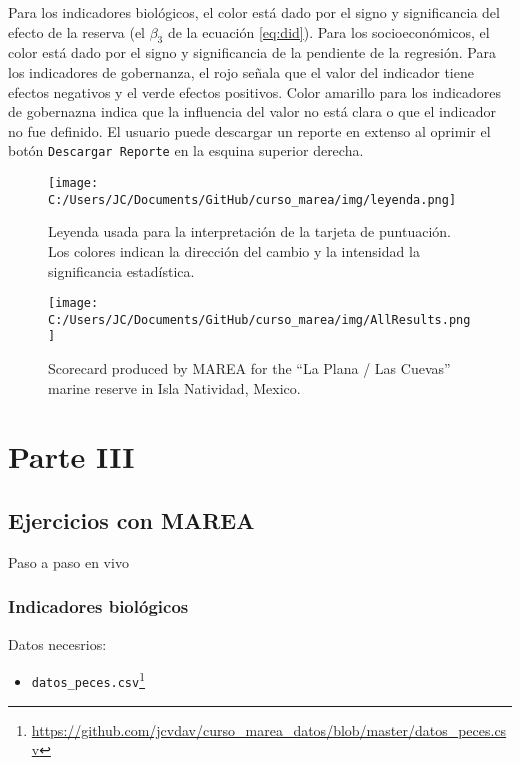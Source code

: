 \documentclass[]{krantz}
\providecommand{\tightlist}{%
  \setlength{\itemsep}{0pt}\setlength{\parskip}{0pt}}
\renewcommand{\href}[2]{#2\footnote{\url{#1}}}
\begin{document}
Para los indicadores biológicos, el color está dado por el signo y
significancia del efecto de la reserva (el \(\beta_3\) de la ecuación
\eqref{eq:did}). Para los socioeconómicos, el color está dado por el signo
y significancia de la pendiente de la regresión. Para los indicadores de
gobernanza, el rojo señala que el valor del indicador tiene efectos
negativos y el verde efectos positivos. Color amarillo para los
indicadores de gobernazna indica que la influencia del valor no está
clara o que el indicador no fue definido. El usuario puede descargar un
reporte en extenso al oprimir el botón \texttt{Descargar\ Reporte} en la
esquina superior derecha.

\begin{figure}
\centering
\texttt{[image: C:/Users/JC/Documents/GitHub/curso\_marea/img/leyenda.png]}
\caption{\label{fig:leyenda}Leyenda usada para la interpretación de la
tarjeta de puntuación. Los colores indican la dirección del cambio y la
intensidad la significancia estadística.}
\end{figure}

\begin{figure}
\centering
\texttt{[image: C:/Users/JC/Documents/GitHub/curso\_marea/img/AllResults.png]}
\caption{\label{fig:resultados}Scorecard produced by MAREA for the ``La
Plana / Las Cuevas'' marine reserve in Isla Natividad, Mexico.}
\end{figure}

\hypertarget{part-parte-iii}{%
\part{Parte III}\label{part-parte-iii}}

\hypertarget{ejercicios-con-marea}{%
\chapter{Ejercicios con MAREA}\label{ejercicios-con-marea}}

Paso a paso en vivo

\hypertarget{indicadores-biologicos}{%
\section{Indicadores biológicos}\label{indicadores-biologicos}}

Datos necesrios:

\begin{itemize}
\tightlist
\item
  \href{https://github.com/jcvdav/curso_marea_datos/blob/master/datos_peces.csv}{\texttt{datos\_peces.csv}}
\end{itemize}
\end{document}
